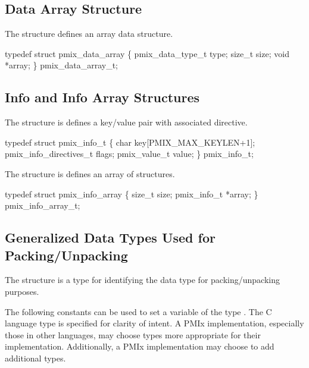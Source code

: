 \subsection{Data Array Structure}

The  structure defines an array data structure.

\cspecificstart
\begin{codepar}
typedef struct pmix_data_array \{
    pmix_data_type_t type;
    size_t size;
    void *array;
\} pmix_data_array_t;
\end{codepar}
\cspecificend



\subsection{Info and Info Array Structures}

The  structure is defines a key/value pair with associated directive.

\cspecificstart
\begin{codepar}
typedef struct pmix_info_t \{
    char key[PMIX_MAX_KEYLEN+1];
    pmix_info_directives_t flags;
    pmix_value_t value;
\} pmix_info_t;
\end{codepar}
\cspecificend

The  structure is defines an array of  structures.

\cspecificstart
\begin{codepar}
typedef struct pmix_info_array \{
    size_t size;
    pmix_info_t *array;
\} pmix_info_array_t;
\end{codepar}
\cspecificend


\subsection{Generalized Data Types Used for Packing/Unpacking}

The  structure is a  type for identifying the data type for packing/unpacking purposes.

The following constants can be used to set a variable of the type .
The C language type is specified for clarity of intent.
A PMIx implementation, especially those in other languages, may choose types more appropriate for their implementation.
Additionally, a PMIx implementation may choose to add additional types.

